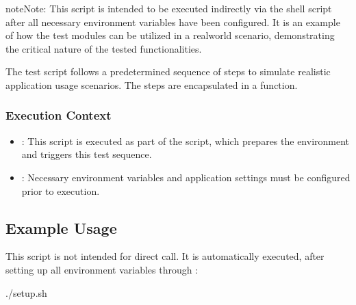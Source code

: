 \documentclass[letterpaper,10pt,english]{sphinxmanual}
\begin{document}
\begin{sphinxadmonition}{note}{Note:}
\sphinxAtStartPar
This script is intended to be executed indirectly via the  shell script after all necessary environment variables have been configured. It is an example of how the test modules can be utilized in a real\sphinxhyphen{}world scenario, demonstrating the critical nature of the tested functionalities.

\sphinxAtStartPar
The test script follows a predetermined sequence of steps  to simulate realistic application usage scenarios. The steps are encapsulated in a function.
\end{sphinxadmonition}


\subsubsection{Execution Context}
\label{\detokenize{file_management_cycle:execution-context}}\begin{itemize}
\item {} 
\sphinxAtStartPar
{}: This script is executed as part of the  script, which prepares the environment and triggers this test sequence.

\item {} 
\sphinxAtStartPar
{}: Necessary environment variables and application settings must be configured prior to execution.

\end{itemize}


\subsection{Example Usage}
\label{\detokenize{file_management_cycle:example-usage}}
\sphinxAtStartPar
This script is not intended for direct call. It is automatically executed, after setting up all environment variables through :

\begin{sphinxVerbatim}[commandchars=\\\{\}]
./setup.sh
\end{sphinxVerbatim}
\end{document}
